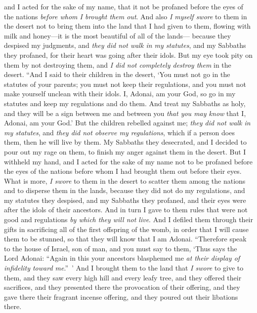\begin{biblechapter}
\verse and I acted for the sake of my name, that it not be profaned before the eyes of the nations \textit{before whom I brought them out}.
\verse And also \textit{I myself swore} to them in the desert not to bring them into the land that I had given to them, flowing with milk and honey—it is the most beautiful of all of the lands—
\verse because they despised my judgments, and \textit{they did not walk in my statutes}, and my Sabbaths they profaned, for their heart was going after their idols.
\verse But my eye took pity on them by not destroying them, and \textit{I did not completely destroy them} in the desert.
\verse “And I said to their children in the desert, ‘You must not go in the statutes of your parents; you must not keep their regulations, and you must not make yourself unclean with their idols.
\verse I, Adonai, am your God, so go in my statutes and keep my regulations and do them.
\verse And treat my Sabbaths as holy, and they will be a sign between me and between you \textit{that you may know} that I, Adonai, am your God.’
\verse But the children rebelled against me; \textit{they did not walk in my statutes}, and \textit{they did not observe my regulations}, which if a person does them, then he will live by them. My Sabbaths they desecrated, and I decided to pour out my rage on them, to finish my anger against them in the desert.
\verse But I withheld my hand, and I acted for the sake of my name not to be profaned before the eyes of the nations before whom I had brought them out before their eyes.
\verse What is more, \textit{I swore} to them in the desert to scatter them among the nations and to disperse them in the lands,
\verse because they did not do my regulations, and my statutes they despised, and my Sabbaths they profaned, and their eyes were after the idols of their ancestors.
\verse And in turn I gave to them rules that were not good and regulations \textit{by which they will not live}.
\verse And I defiled them through their gifts in sacrificing all of the first offspring of the womb, in order that I will cause them to be stunned, so that they will know that I am Adonai.
\verse “Therefore speak to the house of Israel, son of man, and you must say to them, ‘Thus says the Lord Adonai: “Again in this your ancestors blasphemed me \textit{at their display of infidelity toward me}.” ’
\verse And I brought them to the land that \textit{I swore} to give to them, and they saw every high hill and every leafy tree, and they offered their sacrifices, and they presented there the provocation of their offering, and they gave there their fragrant incense offering, and they poured out their libations there.

\end{biblechapter}
